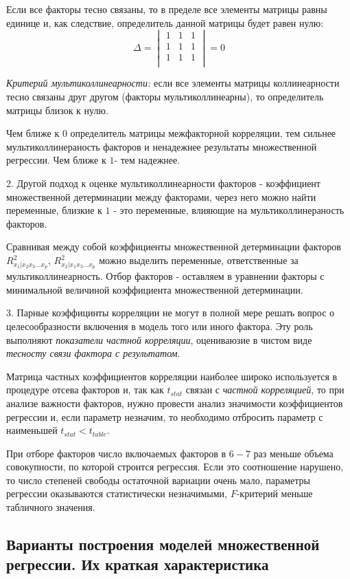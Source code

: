 \documentclass[aps,%
12pt,%
final,%
oneside,
onecolumn,%
musixtex, %
superscriptaddress,%
centertags]{article} %
\theoremstyle{plain}
\theoremstyle{definition}
\theoremstyle{remark}
\begin{document}
Если все факторы тесно связаны, то в пределе все элементы матрицы равны единице и, как следствие, определитель данной матрицы будет равен нулю:
$$ \Delta =
\begin{vmatrix}
	1 & 1 & 1 \\
	1 & 1 & 1 \\
	1 & 1 & 1 \\
\end{vmatrix} = 0
$$

\textit{Критерий мультиколлинеарности:} если все элементы матрицы коллинеарности тесно связаны друг другом (факторы мультиколлинеарны), то определитель матрицы близок к нулю. 

Чем ближе к $0$ определитель матрицы межфакторной корреляции, тем сильнее мультиколлинераность факторов и ненадежнее результаты множественной регрессии. Чем ближе к $1$- тем надежнее.

2. Другой подход к оценке мультиколлинеарности факторов - коэффициент множественной детерминации между факторами, через него можно найти переменные, близкие к $1$ - это переменные, влияющие на мультиколлинераность факторов. 

Сравнивая между собой коэффициенты множественной детерминации факторов $R_{x_1|x_2x_3\ldots x_p}^2$, $R_{x_2|x_1x_3\ldots x_p}^2$ можно выделить переменные, ответственные за мультиколлинеарность. Отбор факторов - оставляем в уравнении факторы с минимальной величиной коэффициента множественной детерминации.

3. Парные коэффицинты корреляции не могут в полной мере решать вопрос о целесообразности включения в модель того или иного фактора. Эту роль выполняют \textit{показатели частной корреляции}, оцениваюзие в чистом виде \textit{тесносту связи фактора с результатом}.

Матрица частных коэффициентов корреляции наиболее широко используется в процедуре отсева факторов и, так как $t_{stat}$ связан с \textit{частной корреляцией}, то при анализе важности факторов, нужно провести анализ значимости коэффициентов регрессии и, если параметр незначим, то необходимо отбросить параметр с наименьшей $t_{stat}< t_{table}$.

При отборе факторов число включаемых факторов в $6-7$ раз меньше объема совокупности, по которой строится регрессия. Если это соотношение нарушено, то число степеней свободы остаточной вариации очень мало, параметры регрессии оказываются статистически незначимыми, $F$-критерий меньше табличного значения.

\newpage
\subsection{Варианты построения моделей множественной регрессии. Их краткая характеристика}
\end{document}

